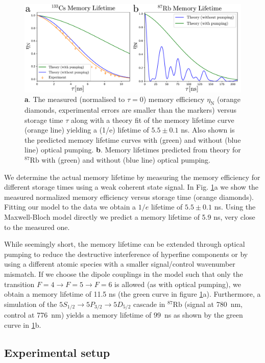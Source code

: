 \begin{figure}[h]
\centering
\includegraphics[width=\linewidth]{lifetime_cs_rb.pdf}
\caption{\textbf{a}. The measured (normalised to $\tau=0$) memory efficiency $\eta_\mathrm{N}$ (orange diamonds, experimental errors are smaller than the markers) versus storage time $\tau$ along with a theory fit of the memory lifetime curve (orange line) yielding a (1/e) lifetime of $5.5\pm0.1$ ns. Also shown is the predicted memory lifetime curves with (green) and without (blue line) optical pumping. \textbf{b}. Memory lifetimes predicted from theory for $^{87}\mathrm{Rb}$ with (green) and without (blue line) optical pumping.}
\label{fig:figLifetime}
\end{figure}

We determine the actual memory lifetime by measuring the memory efficiency for different storage times using a weak coherent state signal. In Fig. \ref{fig:figLifetime}a we show the measured normalized memory efficiency versus storage time (orange diamonds). Fitting our model to the data we obtain a $1/e$ lifetime of $5.5\pm 0.1$ ns. Using the Maxwell-Bloch model directly we predict a memory lifetime of 5.9 ns, very close to the measured one.

While seemingly short, the memory lifetime can be extended through optical pumping to reduce the destructive interference of hyperfine components or by using a different atomic species with a smaller signal/control wavenumber mismatch. If we choose the dipole couplings in the model such that only the transition $F=4 \rightarrow F=5 \rightarrow F=6$ is allowed (as with optical pumping), we obtain a memory lifetime of 11.5 ns (the green curve in figure \ref{fig:figLifetime}a). Furthermore, a simulation of the $5S_{1/2}\rightarrow5P_{3/2}\rightarrow5D_{5/2}$ cascade in $^{87}\mathrm{Rb}$ (signal at 780~nm, control at 776~nm) yields a memory lifetime of $99$~ns as shown by the green curve in \ref{fig:figLifetime}b.

\subsection{Experimental setup \label{setup}}

